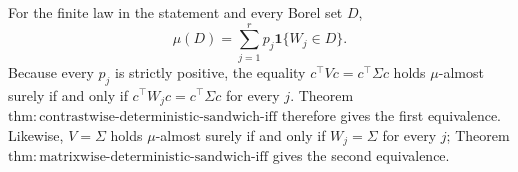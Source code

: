 For the finite law in the statement and every Borel set \(D\),
\[
 \mu(D)=\sum_{j=1}^rp_j\mathbf1\{W_j\in D\}.
\tag{1}
\]
Because every \(p_j\) is strictly positive, the equality
\(c^\top Vc=c^\top\Sigma c\) holds \(\mu\)-almost surely if and only if
\(c^\top W_jc=c^\top\Sigma c\) for every \(j\).  Theorem
\(\mathrm{thm:contrastwise\text{-}deterministic\text{-}sandwich\text{-}iff}\)
therefore gives the first equivalence.  Likewise, \(V=\Sigma\) holds
\(\mu\)-almost surely if and only if \(W_j=\Sigma\) for every \(j\); Theorem
\(\mathrm{thm:matrixwise\text{-}deterministic\text{-}sandwich\text{-}iff}\)
gives the second equivalence.